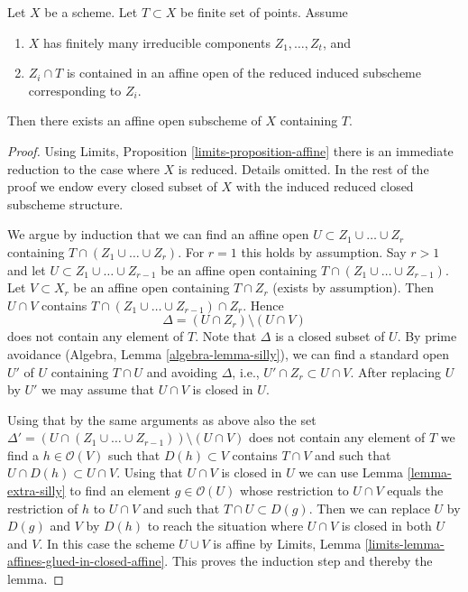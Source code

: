 \begin{lemma}
\label{lemma-finite-set-codim-1-points-in-affine-per-component}
Let $X$ be a scheme. Let $T \subset X$ be finite set of points. Assume
\begin{enumerate}
\item $X$ has finitely many irreducible components $Z_1, \ldots, Z_t$, and
\item $Z_i \cap T$ is contained in an affine open of the reduced
induced subscheme corresponding to $Z_i$.
\end{enumerate}
Then there exists an affine open subscheme of $X$ containing $T$.
\end{lemma}

\begin{proof}
Using Limits, Proposition \ref{limits-proposition-affine}
there is an immediate reduction to the case where $X$
is reduced. Details omitted. In the rest of the proof we
endow every closed subset of $X$ with the induced reduced closed
subscheme structure.

\medskip\noindent
We argue by induction that we can find an affine open
$U \subset Z_1 \cup \ldots \cup Z_r$ containing
$T \cap (Z_1 \cup \ldots \cup Z_r)$. For $r = 1$ this holds by assumption.
Say $r > 1$ and let $U \subset Z_1 \cup \ldots \cup Z_{r -  1}$
be an affine open containing $T \cap (Z_1 \cup \ldots \cup Z_{r - 1})$.
Let $V \subset X_r$ be an affine open containing $T \cap Z_r$ (exists by
assumption). Then $U \cap V$ contains
$T \cap ( Z_1 \cup \ldots \cup Z_{r - 1} ) \cap Z_r$.
Hence
$$
\Delta = (U \cap Z_r) \setminus (U \cap V)
$$
does not contain any element of $T$. Note that $\Delta$ is a closed
subset of $U$. By prime avoidance (Algebra, Lemma \ref{algebra-lemma-silly}),
we can find a standard open $U'$ of $U$ containing $T \cap U$ and avoiding
$\Delta$, i.e., $U' \cap Z_r \subset U \cap V$.
After replacing $U$ by $U'$ we may assume that $U \cap V$ is
closed in $U$.

\medskip\noindent
Using that by the same arguments as above also the set
$\Delta' = (U \cap (Z_1 \cup \ldots \cup Z_{r - 1})) \setminus (U \cap V)$
does not contain any element of $T$ we find a $h \in \mathcal{O}(V)$
such that $D(h) \subset V$ contains $T \cap V$ and such that
$U \cap D(h) \subset U \cap V$. Using that $U \cap V$ is closed in $U$
we can use Lemma \ref{lemma-extra-silly}
to find an element $g \in \mathcal{O}(U)$ whose restriction to $U \cap V$
equals the restriction of $h$ to $U \cap V$ and such that
$T \cap U \subset D(g)$. Then we can replace $U$ by $D(g)$
and $V$ by $D(h)$ to reach the situation where $U \cap V$ is
closed in both $U$ and $V$. In this case the scheme $U \cup V$ is
affine by Limits, Lemma \ref{limits-lemma-affines-glued-in-closed-affine}.
This proves the induction step and thereby the lemma.
\end{proof}

